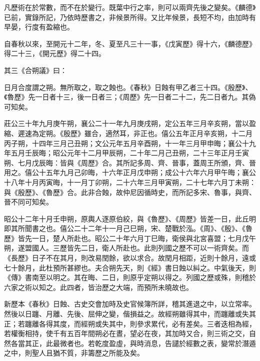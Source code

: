 \begin{pinyinscope}
 凡歷術在於常數，而不在於變行。既葉中行之率，則可以兩齊先後之變矣。《麟德》已前，實錄所記，乃依時歷書之，非候景所得。又比年候景，長短不均，由加時有早晏，行度有盈縮也。



 自春秋以來，至開元十二年，冬、夏至凡三十一事，《戊寅歷》得十六，《麟德歷》得二十三，《開元歷》得二十四。



 其三《合朔議》曰：



 日月合度謂之朔。無所取之，取之蝕也。《春秋》日蝕有甲乙者三十四。《殷歷》、《魯歷》先一日者十三，後一日者三；《周歷》先一日者二十二，先二日者九。其偽可知矣。



 莊公三十年九月庚午朔，襄公二十一年九月庚戌朔，定公五年三月辛亥朔，當以盈縮、遲速為定朔。《殷歷》雖合，適然耳，非正也。僖公五年正月辛亥朔，十二月丙子朔，十四年三月己丑朔；文公元年五月辛酉朔，十一年三月甲申晦；襄公十九年五月壬辰晦；昭公元年十二月甲辰朔，二十年二月己丑朔，二十三年正月壬寅朔、七月戊辰晦：皆與《周歷》合。其所記多周、齊、晉事，蓋周王所頒，齊、晉用之。僖公十五年九月己卯晦，十六年正月戊申朔；成公十六年六月甲午晦；襄公十八年十月丙寅晦，十一月丁卯朔，二十六年三月甲寅朔，二十七年六月丁未朔：與《殷歷》、《魯歷》合。此非合蝕，故仲尼因循時史，而所記多宋、魯事，與齊、晉不同可知矣。



 昭公十二年十月壬申朔，原輿人逐原伯絞，與《魯歷》、《周歷》皆差一日，此丘明即其所聞書之也。僖公二十二年十一月己巳朔，宋、楚戰於泓。《周》、《殷》、《魯歷》皆先一日，楚人所赴也。昭公二十年六月丁巳晦，衛侯與北宮喜盟；七月戊午朔，遂盟國人。三歷皆先二日，衛人所赴也。此則列國之歷不可以一術齊矣。而《長歷》日子不在其月，則改易閏餘，欲以求合。故閏月相距，近則十餘月，遠或七十餘月，此杜預所甚繆也。夫合朔先天，則《經》書日蝕以糾之。中氣後天，則《傳》書南至以明之。其在晦、二日，則原乎定朔以得之。列國之歷或殊，則稽於六家之術以知之。此四者，皆治歷之大端，而預所未曉故也。



 新歷本《春秋》日蝕、古史交會加時及史官候簿所詳，稽其進退之中，以立常率。然後以日躔、月離、先後、屈伸之變，偕損益之。故經朔雖得其中，而躔離或失其正；若躔離各得其度，而經朔或失其中，則參求累代，必有差矣。三者迭相為經，若權衡相持，使千有五百年間朔必在晝，望必在夜，其加時又合，則三術之交，自然各當其正，此最微者也。若乾度盈虛，與時消息，告譴於經數之表，變常於潛遁之中，則聖人且猶不質，非籌歷之所能及矣。




\end{pinyinscope}
